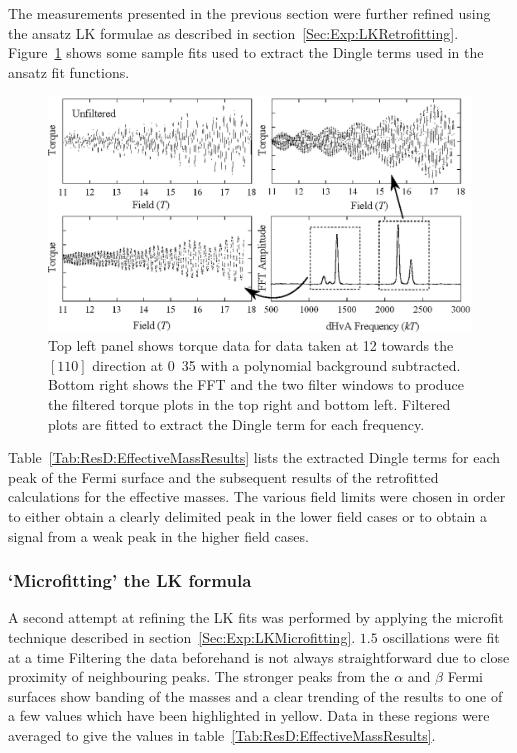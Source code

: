 The measurements presented in the previous section were further refined using the ansatz \ac{LK} formulae as described in section~\ref{Sec:Exp:LKRetrofitting}. Figure~\ref{Fig:ResD:DingleTermExtractionFits} shows some sample fits used to extract the Dingle terms used in the ansatz fit functions.
\begin{figure}[htbp]
    \begin{center}
        \includegraphics[scale=0.9]{Chapter-dHvABaFe2P2/Figures/Mass/FittingDingleTerm/FittingDingleTerm}
        \caption{Top left panel shows torque data for data taken at \unit{12}{\degree} towards the $[110]$ direction at \unit{0.35}{\tesla} with a polynomial background subtracted. Bottom right shows the \ac{FFT} and the two filter windows to produce the filtered torque plots in the top right and bottom left. Filtered plots are fitted to extract the Dingle term for each frequency.}
        \label{Fig:ResD:DingleTermExtractionFits}
    \end{center}
\end{figure}
Table~\ref{Tab:ResD:EffectiveMassResults} lists the extracted Dingle terms for each peak of the Fermi surface and the subsequent results of the retrofitted calculations for the effective masses. The various field limits were chosen in order to either obtain a clearly delimited peak in the lower field cases or to obtain a signal from a weak peak in the higher field cases.


\subsubsection{`Microfitting' the \ac{LK} formula}

A second attempt at refining the \ac{LK} fits was performed by applying the microfit technique described in section~\ref{Sec:Exp:LKMicrofitting}. $1.5$ oscillations were fit at a time Filtering the data beforehand is not always straightforward due to close proximity of neighbouring peaks. The stronger peaks from the $\alpha$ and $\beta$ Fermi surfaces show banding of the masses and a clear trending of the results to one of a few values which have been highlighted in yellow. Data in these regions were averaged to give the values in table~\ref{Tab:ResD:EffectiveMassResults}.

